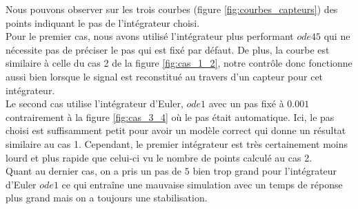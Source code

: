 \documentclass[11pt,french]{article} %
\begin{document}
\quad Nous pouvons observer sur les trois courbes (figure \ref{fig:courbes_capteurs}) des points indiquant le pas de l'intégrateur choisi. \\

\quad Pour le premier cas, nous avons utilisé l'intégrateur plus performant $ode45$ qui ne nécessite pas de préciser le pas qui est fixé par défaut. De plus, la courbe est similaire à celle du cas 2 de la figure \ref{fig:cas_1_2}, notre contrôle donc fonctionne aussi bien lorsque le signal est reconstitué au travers d'un capteur pour cet intégrateur. \\

\quad Le second cas utilise l'intégrateur d'Euler, $ode1$ avec un pas fixé à $0.001$ contrairement à la figure \ref{fig:cas_3_4} où le pas était automatique. Ici, le pas choisi est suffisamment petit pour avoir un modèle correct qui donne un résultat similaire au cas 1. Cependant, le premier intégrateur est très certainement moins lourd et plus rapide que celui-ci vu le nombre de points calculé au cas 2. \\

\quad Quant au dernier cas, on a pris un pas de $5$ bien trop grand pour l'intégrateur d'Euler $ode1$ ce qui entraîne une mauvaise simulation avec un temps de réponse plus grand mais on a toujours une stabilisation.
\end{document}
